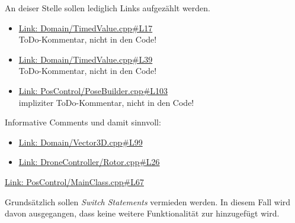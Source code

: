 An deiser Stelle sollen lediglich Links aufgezählt werden.
\begin{itemize}
\item \href{https://github.com/MobMonRob/ROSLabDrohne/blob/d39df8957ec8659b8a6683d8d8ba853db01a82ff/Code/Domain/src/TimedValue.cpp\#L17}{Link: Domain/TimedValue.cpp\#L17}\\
ToDo-Kommentar, nicht in den Code!

\item \href{https://github.com/MobMonRob/ROSLabDrohne/blob/d39df8957ec8659b8a6683d8d8ba853db01a82ff/Code/Domain/src/TimedValue.cpp\#L39}{Link: Domain/TimedValue.cpp\#L39}\\
ToDo-Kommentar, nicht in den Code!

\item \href{https://github.com/MobMonRob/ROSLabDrohne/blob/d39df8957ec8659b8a6683d8d8ba853db01a82ff/Code/PosControl/src/PoseBuilder.cpp\#L103}{Link: PosControl/PoseBuilder.cpp\#L103}\\
impliziter ToDo-Kommentar, nicht in den Code!
\end{itemize}

Informative Comments und damit sinnvoll:
\begin{itemize}
\item \href{https://github.com/MobMonRob/ROSLabDrohne/blob/d39df8957ec8659b8a6683d8d8ba853db01a82ff/Code/Domain/src/Vector3D.cpp\#L99}{Link: Domain/Vector3D.cpp\#L99}
\item \href{https://github.com/MobMonRob/ROSLabDrohne/blob/d39df8957ec8659b8a6683d8d8ba853db01a82ff/Code/DroneController/src/Rotor.cpp\#L26}{Link: DroneController/Rotor.cpp\#L26}
\end{itemize}


\href{https://github.com/MobMonRob/ROSLabDrohne/blob/3c5aeed610150bd19f75241af48a2777cb4c582a/Code/PosControl/src/MainClass.cpp\#L67}{Link: PosControl/MainClass.cpp\#L67}
\\
 

Grundsätzlich sollen \textit{Switch Statements} vermieden werden.
In diesem Fall wird davon ausgegangen, dass keine weitere Funktionalität zur  hinzugefügt wird.






